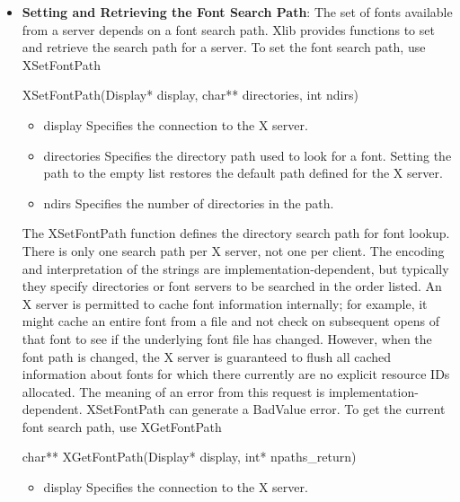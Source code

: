 \documentclass{report}
\begin{document}
\begin{itemize}
        \item \textbf{Setting and Retrieving the Font Search Path}: The set of fonts available from a server depends on a font search path. Xlib provides functions to set and retrieve the search path for a server.
            \bigbreak \noindent 
            To set the font search path, use XSetFontPath
            \bigbreak \noindent 
            \begin{cppcode}
            XSetFontPath(Display* display, char** directories, int ndirs)
            \end{cppcode}
            \bigbreak \noindent
            \begin{itemize}
                \item display Specifies the connection to the X server.
                \item directories Specifies the directory path used to look for a font. Setting the path to the empty list restores the default path defined for the X server.
                \item ndirs Specifies the number of directories in the path.
            \end{itemize}
            The XSetFontPath function defines the directory search path for font lookup. There is only one search path per X server, not one per client. The encoding and interpretation of the strings are implementation-dependent, but typically they specify directories or font servers to be searched in the order listed. An X server is permitted to cache font information internally; for example, it might cache an entire font from a file and not check on subsequent opens of that font to see if the underlying font file has changed. However, when the font path is changed, the X server is guaranteed to flush all cached information about fonts for which there currently are no explicit resource IDs allocated. The meaning of an error from this request is implementation-dependent.
            \bigbreak \noindent 
            XSetFontPath can generate a BadValue error.
            \bigbreak \noindent 
            To get the current font search path, use XGetFontPath
            \bigbreak \noindent 
            \begin{cppcode}
            char** XGetFontPath(Display* display, int* npaths_return)
            \end{cppcode}
            \bigbreak \noindent
            \begin{itemize}
                \item display Specifies the connection to the X server.

\end{itemize}
\end{itemize}
\end{document}
